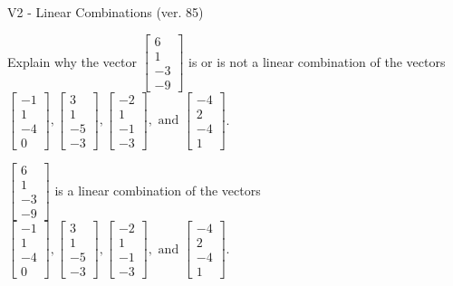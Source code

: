 \begin{exercise}
  \begin{exerciseTitle}V2 - Linear Combinations (ver. 85)\end{exerciseTitle}
  \begin{exerciseStatement}
    Explain why the vector \(\left[\begin{array}{c}
6 \\
1 \\
-3 \\
-9
\end{array}\right]\)  is or is not a linear 
	combination of the vectors \(\left[\begin{array}{c}
-1 \\
1 \\
-4 \\
0
\end{array}\right] , \left[\begin{array}{c}
3 \\
1 \\
-5 \\
-3
\end{array}\right] , \left[\begin{array}{c}
-2 \\
1 \\
-1 \\
-3
\end{array}\right] , \text{ and } \left[\begin{array}{c}
-4 \\
2 \\
-4 \\
1
\end{array}\right]\).
	


  \end{exerciseStatement}
  \begin{exerciseAnswer}
   \(\left[\begin{array}{c}
6 \\
1 \\
-3 \\
-9
\end{array}\right]\) 
  	 is  
	a linear combination of the vectors \(\left[\begin{array}{c}
-1 \\
1 \\
-4 \\
0
\end{array}\right] , \left[\begin{array}{c}
3 \\
1 \\
-5 \\
-3
\end{array}\right] , \left[\begin{array}{c}
-2 \\
1 \\
-1 \\
-3
\end{array}\right] , \text{ and } \left[\begin{array}{c}
-4 \\
2 \\
-4 \\
1
\end{array}\right]\).


\end{exerciseAnswer}
\end{exercise}
